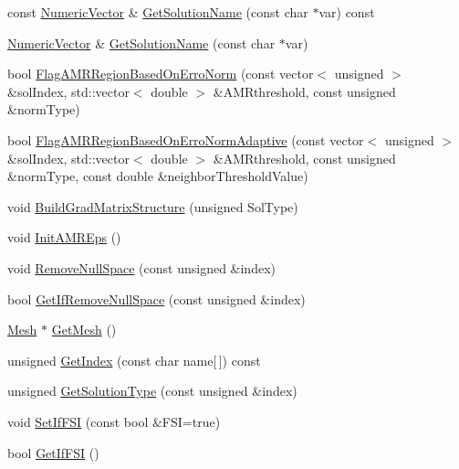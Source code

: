 \begin{DoxyCompactItemize}
const \mbox{\hyperlink{classfemus_1_1_numeric_vector}{Numeric\+Vector}} \& \mbox{\hyperlink{classfemus_1_1_solution_a38d0ba7d713f9fc726a7605e3eb50f9f}{Get\+Solution\+Name}} (const char $\ast$var) const
\item 
\mbox{\hyperlink{classfemus_1_1_numeric_vector}{Numeric\+Vector}} \& \mbox{\hyperlink{classfemus_1_1_solution_ab74a23ebbeb722654d823ea301be51e2}{Get\+Solution\+Name}} (const char $\ast$var)
\item 
bool \mbox{\hyperlink{classfemus_1_1_solution_a875fb4f174e5e08e6501682a62da7c18}{Flag\+A\+M\+R\+Region\+Based\+On\+Erro\+Norm}} (const vector$<$ unsigned $>$ \&sol\+Index, std\+::vector$<$ double $>$ \&A\+M\+Rthreshold, const unsigned \&norm\+Type)
\item 
bool \mbox{\hyperlink{classfemus_1_1_solution_a1cdfede6ad6f2c5955cee4fb79509a2d}{Flag\+A\+M\+R\+Region\+Based\+On\+Erro\+Norm\+Adaptive}} (const vector$<$ unsigned $>$ \&sol\+Index, std\+::vector$<$ double $>$ \&A\+M\+Rthreshold, const unsigned \&norm\+Type, const double \&neighbor\+Threshold\+Value)
\item 
void \mbox{\hyperlink{classfemus_1_1_solution_a0e203fd6ffe75140d435c2e6e047f878}{Build\+Grad\+Matrix\+Structure}} (unsigned Sol\+Type)
\item 
void \mbox{\hyperlink{classfemus_1_1_solution_ae8cd66a86129f27acdc86d89d92849b5}{Init\+A\+M\+R\+Eps}} ()
\item 
void \mbox{\hyperlink{classfemus_1_1_solution_a499cdee4a7d4f16b211f39bcc7848702}{Remove\+Null\+Space}} (const unsigned \&index)
\item 
bool \mbox{\hyperlink{classfemus_1_1_solution_a5c2c8fde70469ca61fa524bc7e591823}{Get\+If\+Remove\+Null\+Space}} (const unsigned \&index)
\item 
\mbox{\hyperlink{classfemus_1_1_mesh}{Mesh}} $\ast$ \mbox{\hyperlink{classfemus_1_1_solution_aa2f09b8eebcbc5f00d4aa7e202474821}{Get\+Mesh}} ()
\item 
unsigned \mbox{\hyperlink{classfemus_1_1_solution_ab7027e7a2d3e29aafbc770d4a908a3ec}{Get\+Index}} (const char name\mbox{[}$\,$\mbox{]}) const
\item 
unsigned \mbox{\hyperlink{classfemus_1_1_solution_a419e9dba724a5e6e460c357c59119c02}{Get\+Solution\+Type}} (const unsigned \&index)
\item 
void \mbox{\hyperlink{classfemus_1_1_solution_a482fdf54bd77e30b70c896c991e44d2f}{Set\+If\+F\+SI}} (const bool \&F\+SI=true)
\item 
bool \mbox{\hyperlink{classfemus_1_1_solution_a426c80579e836e29def3e98b14fcfaf1}{Get\+If\+F\+SI}} ()
\end{DoxyCompactItemize}
